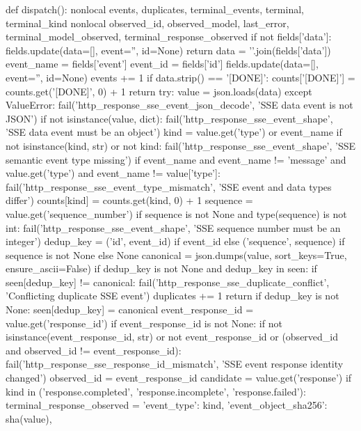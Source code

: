 {    def dispatch():
        nonlocal events, duplicates, terminal_events, terminal, terminal_kind
        nonlocal observed_id, observed_model, last_error, terminal_model_observed, terminal_response_observed
        if not fields['data']:
            fields.update(data=[], event='', id=None)
            return
        data = '\n'.join(fields['data'])
        event_name = fields['event']
        event_id = fields['id']
        fields.update(data=[], event='', id=None)
        events += 1
        if data.strip() == '[DONE]':
            counts['[DONE]'] = counts.get('[DONE]', 0) + 1
            return
        try:
            value = json.loads(data)
        except ValueError:
            fail('http_response_sse_event_json_decode', 'SSE data event is not JSON')
        if not isinstance(value, dict):
            fail('http_response_sse_event_shape', 'SSE data event must be an object')
        kind = value.get('type') or event_name
        if not isinstance(kind, str) or not kind:
            fail('http_response_sse_event_shape', 'SSE semantic event type missing')
        if event_name and event_name != 'message' and value.get('type') and event_name != value['type']:
            fail('http_response_sse_event_type_mismatch', 'SSE event and data types differ')
        counts[kind] = counts.get(kind, 0) + 1
        sequence = value.get('sequence_number')
        if sequence is not None and type(sequence) is not int:
            fail('http_response_sse_event_shape', 'SSE sequence number must be an integer')
        dedup_key = ('id', event_id) if event_id else ('sequence', sequence) if sequence is not None else None
        canonical = json.dumps(value, sort_keys=True, ensure_ascii=False)
        if dedup_key is not None and dedup_key in seen:
            if seen[dedup_key] != canonical:
                fail('http_response_sse_duplicate_conflict', 'Conflicting duplicate SSE event')
            duplicates += 1
            return
        if dedup_key is not None:
            seen[dedup_key] = canonical
        event_response_id = value.get('response_id')
        if event_response_id is not None:
            if not isinstance(event_response_id, str) or not event_response_id or (observed_id and observed_id != event_response_id):
                fail('http_response_sse_response_id_mismatch', 'SSE event response identity changed')
            observed_id = event_response_id
        candidate = value.get('response')
        if kind in ('response.completed', 'response.incomplete', 'response.failed'):
            terminal_response_observed = {
                'event_type': kind, 'event_object_sha256': sha(value),
}}
